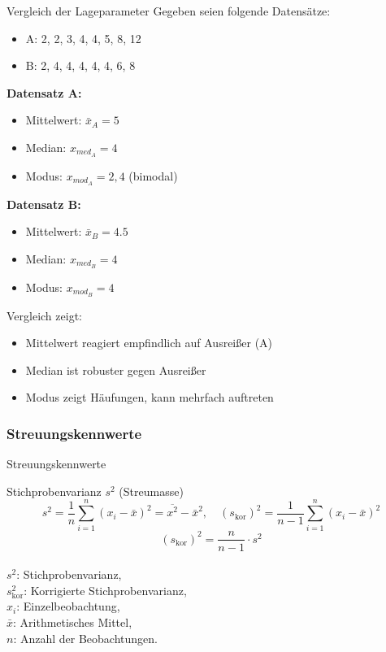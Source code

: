 \begin{example2}{Vergleich der Lageparameter}
Gegeben seien folgende Datensätze:
\begin{itemize}
    \item A: 2, 2, 3, 4, 4, 5, 8, 12
    \item B: 2, 4, 4, 4, 4, 4, 6, 8
\end{itemize}

\textbf{Datensatz A:}
\begin{itemize}
    \item Mittelwert: $\bar{x}_A = 5$
    \item Median: $x_{med_A} = 4$
    \item Modus: $x_{mod_A} = 2, 4$ (bimodal)
\end{itemize}

\textbf{Datensatz B:}
\begin{itemize}
    \item Mittelwert: $\bar{x}_B = 4.5$
    \item Median: $x_{med_B} = 4$
    \item Modus: $x_{mod_B} = 4$
\end{itemize}

Vergleich zeigt:
\begin{itemize}
    \item Mittelwert reagiert empfindlich auf Ausreißer (A)
    \item Median ist robuster gegen Ausreißer
    \item Modus zeigt Häufungen, kann mehrfach auftreten
\end{itemize}
\end{example2}

\subsubsection{Streuungskennwerte}

\begin{definition}{Streuungskennwerte}
\end{definition}

\begin{definition}{Stichprobenvarianz $s^{2}$ (Streumasse)}
$$
s^{2}=\frac{1}{n} \sum_{i=1}^{n}\left(x_{i}-\bar{x}\right)^{2}=\overline{x^{2}}-\bar{x}^{2}, \quad\left(s_{\text{kor}}\right)^{2}=\frac{1}{n-1} \sum_{i=1}^{n}\left(x_{i}-\bar{x}\right)^{2}
$$
$$
\left(s_{\text{kor}}\right)^{2}=\frac{n}{n-1} \cdot s^{2}
$$
\\
$s^{2}$: Stichprobenvarianz, \\
$s_{\text{kor}}^{2}$: Korrigierte Stichprobenvarianz, \\
$x_{i}$: Einzelbeobachtung, \\
$\bar{x}$: Arithmetisches Mittel, \\
$n$: Anzahl der Beobachtungen.
\end{definition}

